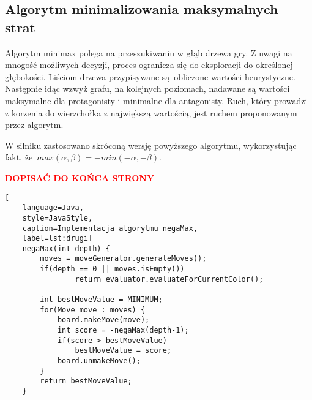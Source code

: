 \subsection{Algorytm minimalizowania maksymalnych strat}
\label{subsec:algorytm-minimalizowania-maksymalnych-strat}

Algorytm minimax polega na przeszukiwaniu w głąb drzewa gry.
Z uwagi na mnogość możliwych decyzji, proces ogranicza się do eksploracji do określonej głębokości.
Liściom drzewa przypisywane są~obliczone wartości heurystyczne.
Następnie idąc wzwyż grafu, na kolejnych poziomach, nadawane są wartości maksymalne dla protagonisty i minimalne dla antagonisty.
Ruch, który prowadzi z korzenia do wierzchołka z największą wartością, jest ruchem proponowanym przez algorytm.

W silniku zastosowano skróconą wersję powyższego algorytmu, wykorzystując fakt, że~$max(\alpha, \beta) = -min(-\alpha, -\beta)$.

\begin{center}
    \textcolor{red}{\textbf{DOPISAĆ DO KOŃCA STRONY}}
\end{center}
\newpage


\begin{lstlisting}[
    language=Java,
    style=JavaStyle,
    caption=Implementacja algorytmu negaMax,
    label=lst:drugi]
    negaMax(int depth) {
        moves = moveGenerator.generateMoves();
        if(depth == 0 || moves.isEmpty())
                return evaluator.evaluateForCurrentColor();

        int bestMoveValue = MINIMUM;
        for(Move move : moves) {
            board.makeMove(move);
            int score = -negaMax(depth-1);
            if(score > bestMoveValue)
                bestMoveValue = score;
            board.unmakeMove();
        }
        return bestMoveValue;
    }
\end{lstlisting}


